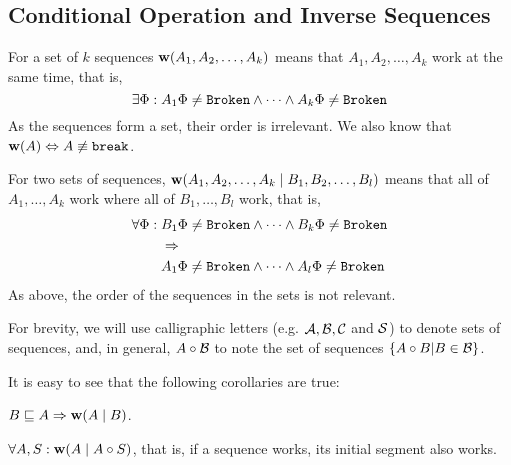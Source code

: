 

\subsection{Conditional Operation and Inverse Sequences}

\begin{mydef}[$\works{x}$]
For a set of $k$ sequences
$\mathbf{w}({A_1,A_2,\ldots,A_k})$ means that 
$A_1,A_2,\ldots,A_k$ work at the same time, that is,
\[\exists \Phi: A_1\Phi\neq\mathtt{Broken} \wedge \cdots \wedge A_k\Phi\neq\mathtt{Broken}\]
As the sequences form a set, their order is irrelevant.
We also know that $\mathbf{w}({A}) \Leftrightarrow A\not\equiv \mathtt{break}$. 
\end{mydef}

\begin{mydef}[$\worksc{x}{y}$]
For two sets of sequences, $\mathbf{w}({A_1,A_2,\ldots,A_k}\mathrel{|}{B_1,B_2,\ldots,B_l})$ means that 
all of $A_1,\ldots,A_k$ work where all of $B_1,\ldots,B_l$ work,
that is,
\begin{align*}
\forall \Phi:{}& 
B_1\Phi\neq\mathtt{Broken} \wedge \cdots \wedge B_k\Phi\neq\mathtt{Broken}\\
&\Rightarrow\\
&A_1\Phi\neq\mathtt{Broken} \wedge \cdots \wedge A_l\Phi\neq\mathtt{Broken}
\end{align*}
As above, the order of the sequences in the sets is not relevant.
\end{mydef}

\begin{mydef}
For brevity, we will use calligraphic letters (e.g. $\mathcal{A, B, C}$ and $\mathcal{S}$)
to denote sets of sequences,
and, in general, $A\circ\mathcal{B}$ to note the set of sequences $\{A\circ B|B\in\mathcal{B}\}$.
\end{mydef}

It is easy to see that the following corollaries are true:


\begin{mycor}
$B\sqsubseteq A \Rightarrow \mathbf{w}({A}\mathrel{|}{B})$.
\end{mycor}

\begin{mycor}\label{worksextpostfix}
$\forall A,S: \mathbf{w}({A}\mathrel{|}{A\circ S})$, that is, if a sequence works, its initial segment also works.
\end{mycor}

